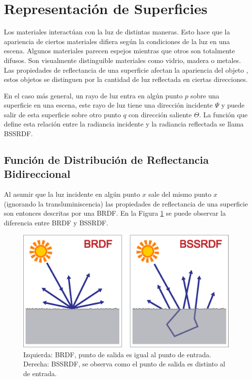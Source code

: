 \section{Representación de Superficies}
\label{sec:surface_rep}

Los materiales interactúan con la luz de distintas maneras. Esto hace que la apariencia de ciertos materiales difiera según la condiciones de la luz en una escena. Algunos materiales parecen espejos mientras que otros son totalmente difusos. Son visualmente distinguible materiales como vidrio, madera o metales. Las propiedades de reflectancia de una superficie afectan la apariencia del objeto \cite{advanced_gi2006}, estos objetos se distinguen por la cantidad de luz reflectada en ciertas direcciones. 

En el caso más general, un rayo de luz entra en algún punto $p$ sobre una superficie en una escena, este rayo de luz tiene una dirección incidente $\Psi$ y puede salir de esta superficie sobre otro punto $q$ con dirección saliente $\Theta$. La función que define esta relación entre la radiancia incidente y la radiancia reflectada se llama \ac{BSSRDF}.

\subsection{Función de Distribución de Reflectancia Bidireccional}
Al asumir que la luz incidente en algún punto $x$ sale del mismo punto $x$ (ignorando la transluminiscencia) las propiedades de reflectancia de una superficie son entonces descritas por una \ac{BRDF}. En la Figura \ref{fig:bssrdf} se puede observar la diferencia entre \ac{BRDF} y \ac{BSSRDF}.

\begin{figure}[H]
	\centering
	\includegraphics[width=.6\linewidth]{media/brdf_vs.eps}
	\caption
	{
    	Izquierda: BRDF, punto de salida es igual al punto de entrada. Derecha: BSSRDF, se observa como el punto de salida es distinto al de entrada.
	}
	\label{fig:bssrdf}
\end{figure}

